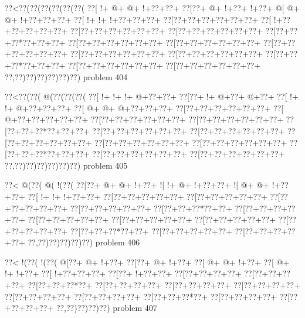 \vbox{\vbox{\goo
\0??<\0??(\0??(\0??(\0??(\0??(\0??(
\0??[\- !+\- @+\- @+\- !+\0??+\0??+
\0??[\0??+\- @+\- !+\0??+\- !+\0??+
\- @[\- @+\- @+\- !+\0??+\0??+\0??+
\0??[\- !+\- !+\- !+\0??+\0??+\0??+
\0??[\0??+\0??+\0??+\0??+\0??+\0??+
\0??[\- !+\0??+\0??+\0??+\0??+\0??+
\0??[\0??+\0??+\0??+\0??+\0??+\0??+
\0??[\0??+\0??+\0??+\0??+\0??+\0??+
\0??[\0??+\0??+\0??*\0??+\0??+\0??+
\0??[\0??+\0??+\0??+\0??+\0??+\0??+
\0??[\0??+\0??+\0??+\0??+\0??+\0??+
\0??[\0??+\0??+\0??+\0??+\0??+\0??+
\0??[\0??+\0??+\0??+\0??+\0??+\0??+
\0??[\0??+\0??+\0??+\0??+\0??+\0??+
\0??[\0??+\0??+\0??*\0??+\0??+\0??+
\0??[\0??+\0??+\0??+\0??+\0??+\0??+
\0??[\0??+\0??+\0??+\0??+\0??+\0??+
\0??,\0??)\0??)\0??)\0??)\0??)\0??)
}
\hfil problem 404\hfil\break
}

\vbox{\vbox{\goo
\0??<\0??(\0??(\- @(\0??(\0??(\0??(
\0??[\- !+\- !+\- !+\- @+\0??+\0??+
\0??[\0??+\- !+\- @+\0??+\- @+\0??+
\0??[\- !+\- !+\- @+\0??+\0??+\0??+
\0??[\- @+\- @+\- @+\0??+\0??+\0??+
\0??[\0??+\0??+\0??+\0??+\0??+\0??+
\0??[\- @+\0??+\0??+\0??+\0??+\0??+
\0??[\0??+\0??+\0??+\0??+\0??+\0??+
\0??[\0??+\0??+\0??+\0??+\0??+\0??+
\0??[\0??+\0??+\0??*\0??+\0??+\0??+
\0??[\0??+\0??+\0??+\0??+\0??+\0??+
\0??[\0??+\0??+\0??+\0??+\0??+\0??+
\0??[\0??+\0??+\0??+\0??+\0??+\0??+
\0??[\0??+\0??+\0??+\0??+\0??+\0??+
\0??[\0??+\0??+\0??+\0??+\0??+\0??+
\0??[\0??+\0??+\0??*\0??+\0??+\0??+
\0??[\0??+\0??+\0??+\0??+\0??+\0??+
\0??[\0??+\0??+\0??+\0??+\0??+\0??+
\0??,\0??)\0??)\0??)\0??)\0??)\0??)
}
\hfil problem 405\hfil\break
}

\vbox{\vbox{\goo
\0??<\- @(\0??(\- @(\- !(\0??(
\0??[\0??+\- @+\- @+\- !+\0??+
\- ![\- !+\- @+\- !+\0??+\0??+
\- ![\- @+\- @+\- !+\0??+\0??+
\0??[\- !+\- !+\- !+\0??+\0??+
\0??[\0??+\0??+\0??+\0??+\0??+
\0??[\0??+\0??+\0??+\0??+\0??+
\0??[\0??+\0??+\0??+\0??+\0??+
\0??[\0??+\0??+\0??+\0??+\0??+
\0??[\0??+\0??+\0??*\0??+\0??+
\0??[\0??+\0??+\0??+\0??+\0??+
\0??[\0??+\0??+\0??+\0??+\0??+
\0??[\0??+\0??+\0??+\0??+\0??+
\0??[\0??+\0??+\0??+\0??+\0??+
\0??[\0??+\0??+\0??+\0??+\0??+
\0??[\0??+\0??+\0??*\0??+\0??+
\0??[\0??+\0??+\0??+\0??+\0??+
\0??[\0??+\0??+\0??+\0??+\0??+
\0??,\0??)\0??)\0??)\0??)\0??)
}
\hfil problem 406\hfil\break
}

\vbox{\vbox{\goo
\0??<\- !(\0??(\- !(\0??(
\- @[\0??+\- @+\- !+\0??+
\0??[\0??+\- @+\- !+\0??+
\0??[\- @+\- @+\- !+\0??+
\0??[\- @+\- !+\- !+\0??+
\0??[\- !+\0??+\0??+\0??+
\0??[\0??+\- !+\0??+\0??+
\0??[\0??+\0??+\0??+\0??+
\0??[\0??+\0??+\0??+\0??+
\0??[\0??+\0??+\0??*\0??+
\0??[\0??+\0??+\0??+\0??+
\0??[\0??+\0??+\0??+\0??+
\0??[\0??+\0??+\0??+\0??+
\0??[\0??+\0??+\0??+\0??+
\0??[\0??+\0??+\0??+\0??+
\0??[\0??+\0??+\0??*\0??+
\0??[\0??+\0??+\0??+\0??+
\0??[\0??+\0??+\0??+\0??+
\0??,\0??)\0??)\0??)\0??)
}
\hfil problem 407\hfil\break
}

